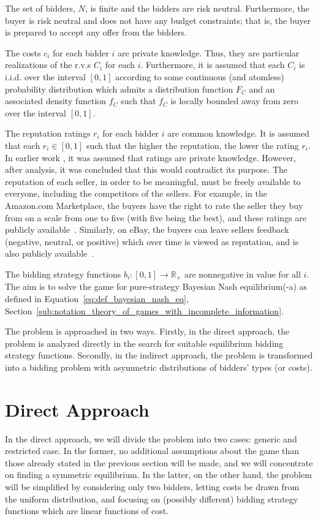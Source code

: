 The set of bidders, $N$, is finite and the bidders are risk neutral. Furthermore, the buyer is risk neutral and does not have any budget constraints; that is, the buyer is prepared to accept any offer from the bidders.

The costs $c_i$ for each bidder $i$ are private knowledge. Thus, they are particular realizations of the r.v.s $C_i$ for each $i$. Furthermore, it is assumed that each $C_i$ is i.i.d. over the interval $[0,1]$ according to some continuous (and atomless) probability distribution which admits a distribution function $F_{C}$ and an associated density function $f_{C}$ such that $f_C$ is locally bounded away from zero over the interval $[0,1]$.
	
The reputation ratings $r_i$ for each bidder $i$ are common knowledge. It is assumed that each $r_i\in [0,1]$ such that the higher the reputation, the lower the rating $r_i$. In earlier work \cite{DMKonkaUbi11}, it was assumed that ratings are private knowledge. However, after analysis, it was concluded that this would contradict its purpose. The reputation of each seller, in order to be meaningful, must be freely available to everyone, including the competitors of the sellers. For example, in the Amazon.com Marketplace, the buyers have the right to rate the seller they buy from on a scale from one to five (with five being the best), and these ratings are publicly available~\cite{AMAZON}. Similarly, on eBay, the buyers can leave sellers feedback (negative, neutral, or positive) which over time is viewed as reputation, and is also publicly available~\cite{EBAY}.
	
The bidding strategy functions $b_i: [0,1]\to\mathbb{R_+}$ are nonnegative in value for all $i$. The aim is to solve the game for pure-strategy Bayesian Nash equilibrium(-a) as defined in Equation~\eqref{eq:def_bayesian_nash_eq}, Section~\ref{sub:notation_theory_of_games_with_incomplete_information}.

The problem is approached in two ways. Firstly, in the direct approach, the problem is analyzed directly in the search for suitable equilibrium bidding strategy functions. Secondly, in the indirect approach, the problem is transformed into a bidding problem with asymmetric distributions of bidders' types (or costs).

\section{Direct Approach} %
\label{sub:direct_approach}
In the direct approach, we will divide the problem into two cases: generic and restricted case. In the former, no additional assumptions about the game than those already stated in the previous section will be made, and we will concentrate on finding a symmetric equilibrium. In the latter, on the other hand, the problem will be simplified by considering only two bidders, letting costs be drawn from the uniform distribution, and focusing on (possibly different) bidding strategy functions which are linear functions of cost.

